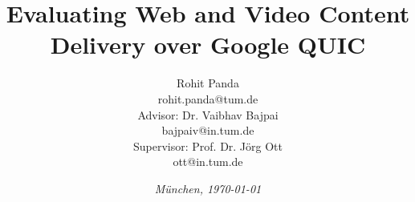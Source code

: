 %
% 
% 
%

\newcommand{\shiftedframetitle}[1]{\frametitle{\\\vspace{-2.5cm}#1}\vspace{0.5cm}}





\renewcommand{\PersonTitel}{}
\newcommand{\Datum}{\today}

\renewcommand{\PraesentationFusszeileZusatz}{| rohit.panda@tum.de | Master's Thesis Presentation}

\title{\textbf{Evaluating Web and Video Content Delivery over Google QUIC}
}

\author{\vspace{2cm} Rohit Panda\\rohit.panda@tum.de \\ 
        \vspace{0.2cm} Advisor: Dr. Vaibhav Bajpai \\ bajpaiv@in.tum.de \\
        \vspace{0.2cm} Supervisor: Prof. Dr. Jörg Ott \\ ott@in.tum.de
    }

\date[]{\textit{M\"unchen, \Datum} }




